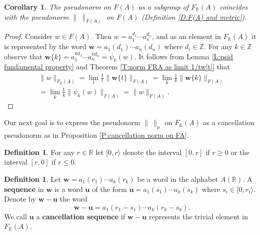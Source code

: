 \documentclass[12pt]{amsart}
\newtheorem{cor}[prop]{Corollary}
\theoremstyle{definition}
\newtheorem{defn}[prop]{Definition}
\def\RR{\ensuremath{\mathbb{R}}}
\def\ZZ{\ensuremath{\mathbb{Z}}}
\newcommand{\B}[1]{\mathbf{#1}}
\newcommand{\trc}[1]{\{ #1 \}}   %
\def\Free{F}
\newcommand{\myinterval}[1]{[ #1 \rangle}
\begin{document}
\begin{cor}\label{C:F(A) as a subgroup of FR(A)} %
The pseudonorm on $F(A)$ as a subgroup of $F_\RR(A)$ coincides with the pseudonorm $\| \ \|_{\Free(A)}$ on $F(A)$ (Definition \ref{D:F(A) and metric}). %
\end{cor}

\begin{proof}
Consider $w \in \Free(A)$.
Then $w=a_1^{d_1} \cdots a_n^{d_n}$, and as an element in $\Free_\RR(A)$ it is represented by the word $\B w=a_1(d_1) \cdots a_n(d_n)$ where $d_i \in \ZZ$.
For any $k \in \ZZ$ observe that $\B w\trc{k} = a_1^{kd_1} \cdots a_n^{kd_n} = \psi_k(w)$.
It follows from Lemma \ref{L:psid fundamental property} and Theorem \ref{T:norm FRA as limit 1/tw[t]} that
\begin{multline*}
\|w\|_{\Free_\RR(A)} = \lim_t \tfrac{1}{t}\|\B w\trc{t}\|_{\Free(A)} =
\lim_k \tfrac{1}{k} \| \B w\trc{k}\|_{\Free(A)} 
\\
=
\lim_k \tfrac{1}{k} \| \psi_k(w)\|_{\Free(A)} = \|w\|_{\Free(A)}.
\end{multline*}
\end{proof}






Our next goal is to express the pseudonorm $\| \ \|_\mu$ on $F_\RR(A)$ as a cancellation pseudonorm as in Proposition \ref{P:cancellation norm on FA}.


\begin{defn}
For any $r \in \RR$ let $\myinterval{0,r}$ denote the interval $[0,r]$ if $r \geq 0$ or the  interval $[r,0]$ if $r\leq 0$.
\end{defn}


\begin{defn}\label{D:cancellation sequences FRA}
Let $\B w = a_1(r_1) \cdots a_k(r_k)$ be a word in the alphabet $A(\RR)$.
A {\bf sequence} in $\B w$ is a word $\B u$ of the form $\B u=a_1(s_1) \cdots a_k(s_k)$ where $s_i \in \myinterval{0,r_i}$.
Denote by $\B w - \B u$ the word
\[
\B w - \B u = a_1(r_1-s_1) \cdots a_k(r_k-s_k).
\]
We call $\B u$ a {\bf cancellation sequence} if $\B w - \B u$ represents the trivial element in $\Free_\RR(A)$.
\end{defn}
\end{document}
